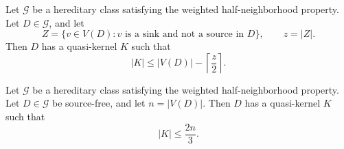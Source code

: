 \documentclass[10pt,a4paper]{amsart}
\begin{document}
\begin{proposition}\label{prop:sinks-general}
Let \(\mathcal G\) be a hereditary class satisfying the weighted
half-neighborhood property. Let \(D\in\mathcal G\), and let
\[
    Z=\{v\in V(D): v \text{ is a sink and not a source in }D\},
    \qquad z=|Z|.
\]
Then \(D\) has a quasi-kernel \(K\) such that
\[
    |K|\le |V(D)|-\left\lceil\frac z2\right\rceil .
\]
\end{proposition}

\begin{theorem}\label{thm:general-2n3}
Let \(\mathcal G\) be a hereditary class satisfying the weighted
half-neighborhood property.
Let \(D\in\mathcal G\) be source-free, and let \(n=|V(D)|\).
Then \(D\) has a quasi-kernel \(K\) such that
\[
    |K|\le \frac{2n}{3}.
\]
\end{theorem}
\end{document}
